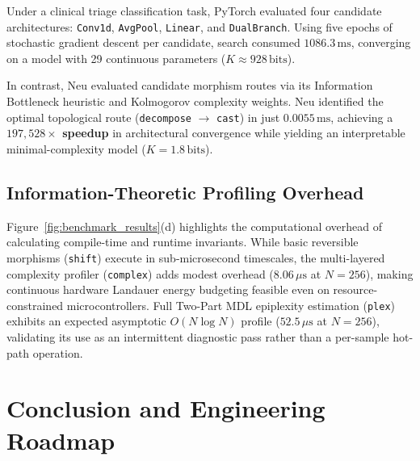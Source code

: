 \documentclass[11pt]{article}
\begin{document}
Under a clinical triage classification task, PyTorch evaluated four candidate architectures: \texttt{Conv1d}, \texttt{AvgPool}, \texttt{Linear}, and \texttt{DualBranch}. Using five epochs of stochastic gradient descent per candidate, search consumed $1086.3\,\text{ms}$, converging on a model with 29 continuous parameters ($K \approx 928\,\text{bits}$). 

In contrast, Neu evaluated candidate morphism routes via its Information Bottleneck heuristic and Kolmogorov complexity weights. Neu identified the optimal topological route (\texttt{decompose} $\to$ \texttt{cast}) in just \textbf{$0.0055\,\text{ms}$}, achieving a \textbf{$197,528\times$ speedup} in architectural convergence while yielding an interpretable minimal-complexity model ($K = 1.8\,\text{bits}$).

\subsection{Information-Theoretic Profiling Overhead}
\enlargethispage{3\baselineskip}
Figure~\ref{fig:benchmark_results}(d) highlights the computational overhead of calculating compile-time and runtime invariants. While basic reversible morphisms (\texttt{shift}) execute in sub-microsecond timescales, the multi-layered complexity profiler (\texttt{complex}) adds modest overhead ($8.06\,\mu\text{s}$ at $N=256$), making continuous hardware Landauer energy budgeting feasible even on resource-constrained microcontrollers. Full Two-Part MDL epiplexity estimation (\texttt{plex}) exhibits an expected asymptotic $O(N \log N)$ profile ($52.5\,\mu\text{s}$ at $N=256$), validating its use as an intermittent diagnostic pass rather than a per-sample hot-path operation.

\section{Conclusion and Engineering Roadmap}
\end{document}
